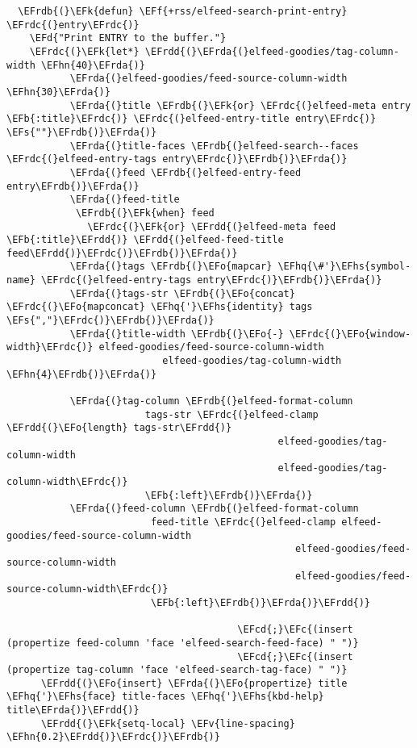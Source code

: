 \documentclass[a4wide,10pt]{article}
\newcommand{\EFc}[1]{\textcolor{EFc}{#1}} %
\newcommand{\EFcd}[1]{\textcolor{EFcd}{#1}} %
\newcommand{\EFs}[1]{\textcolor{EFs}{#1}} %
\newcommand{\EFd}[1]{\textcolor{EFd}{#1}} %
\newcommand{\EFk}[1]{\textcolor{EFk}{#1}} %
\newcommand{\EFb}[1]{\textcolor{EFb}{#1}} %
\newcommand{\EFf}[1]{\textcolor{EFf}{#1}} %
\newcommand{\EFv}[1]{\textcolor{EFv}{#1}} %
\newcommand{\EFo}[1]{\textcolor{EFo}{#1}} %
\newcommand{\EFhn}[1]{\textcolor{EFhn}{\textbf{#1}}} %
\newcommand{\EFhq}[1]{\textcolor{EFhq}{#1}} %
\newcommand{\EFhs}[1]{\textcolor{EFhs}{#1}} %
\newcommand{\EFrda}[1]{\textcolor{EFrda}{#1}} %
\newcommand{\EFrdb}[1]{\textcolor{EFrdb}{#1}} %
\newcommand{\EFrdc}[1]{\textcolor{EFrdc}{#1}} %
\newcommand{\EFrdd}[1]{\textcolor{EFrdd}{#1}} %
\begin{document}
\begin{Code}
\begin{Verbatim}
  \EFrdb{(}\EFk{defun} \EFf{+rss/elfeed-search-print-entry} \EFrdc{(}entry\EFrdc{)}
    \EFd{"Print ENTRY to the buffer."}
    \EFrdc{(}\EFk{let*} \EFrdd{(}\EFrda{(}elfeed-goodies/tag-column-width \EFhn{40}\EFrda{)}
           \EFrda{(}elfeed-goodies/feed-source-column-width \EFhn{30}\EFrda{)}
           \EFrda{(}title \EFrdb{(}\EFk{or} \EFrdc{(}elfeed-meta entry \EFb{:title}\EFrdc{)} \EFrdc{(}elfeed-entry-title entry\EFrdc{)} \EFs{""}\EFrdb{)}\EFrda{)}
           \EFrda{(}title-faces \EFrdb{(}elfeed-search--faces \EFrdc{(}elfeed-entry-tags entry\EFrdc{)}\EFrdb{)}\EFrda{)}
           \EFrda{(}feed \EFrdb{(}elfeed-entry-feed entry\EFrdb{)}\EFrda{)}
           \EFrda{(}feed-title
            \EFrdb{(}\EFk{when} feed
              \EFrdc{(}\EFk{or} \EFrdd{(}elfeed-meta feed \EFb{:title}\EFrdd{)} \EFrdd{(}elfeed-feed-title feed\EFrdd{)}\EFrdc{)}\EFrdb{)}\EFrda{)}
           \EFrda{(}tags \EFrdb{(}\EFo{mapcar} \EFhq{\#'}\EFhs{symbol-name} \EFrdc{(}elfeed-entry-tags entry\EFrdc{)}\EFrdb{)}\EFrda{)}
           \EFrda{(}tags-str \EFrdb{(}\EFo{concat} \EFrdc{(}\EFo{mapconcat} \EFhq{'}\EFhs{identity} tags \EFs{","}\EFrdc{)}\EFrdb{)}\EFrda{)}
           \EFrda{(}title-width \EFrdb{(}\EFo{-} \EFrdc{(}\EFo{window-width}\EFrdc{)} elfeed-goodies/feed-source-column-width
                           elfeed-goodies/tag-column-width \EFhn{4}\EFrdb{)}\EFrda{)}

           \EFrda{(}tag-column \EFrdb{(}elfeed-format-column
                        tags-str \EFrdc{(}elfeed-clamp \EFrdd{(}\EFo{length} tags-str\EFrdd{)}
                                               elfeed-goodies/tag-column-width
                                               elfeed-goodies/tag-column-width\EFrdc{)}
                        \EFb{:left}\EFrdb{)}\EFrda{)}
           \EFrda{(}feed-column \EFrdb{(}elfeed-format-column
                         feed-title \EFrdc{(}elfeed-clamp elfeed-goodies/feed-source-column-width
                                                  elfeed-goodies/feed-source-column-width
                                                  elfeed-goodies/feed-source-column-width\EFrdc{)}
                         \EFb{:left}\EFrdb{)}\EFrda{)}\EFrdd{)}

                                        \EFcd{;}\EFc{(insert (propertize feed-column 'face 'elfeed-search-feed-face) " ")}
                                        \EFcd{;}\EFc{(insert (propertize tag-column 'face 'elfeed-search-tag-face) " ")}
      \EFrdd{(}\EFo{insert} \EFrda{(}\EFo{propertize} title \EFhq{'}\EFhs{face} title-faces \EFhq{'}\EFhs{kbd-help} title\EFrda{)}\EFrdd{)}
      \EFrdd{(}\EFk{setq-local} \EFv{line-spacing} \EFhn{0.2}\EFrdd{)}\EFrdc{)}\EFrdb{)}


\end{Verbatim}
\end{Code}
\end{document}
